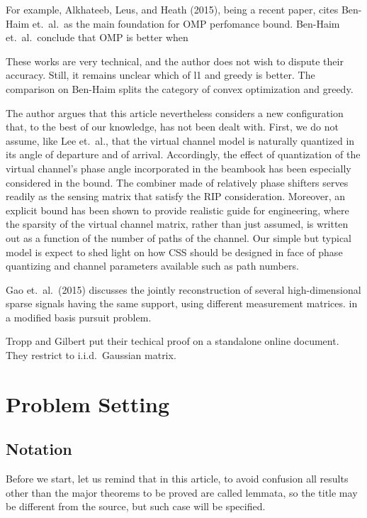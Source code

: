 \documentclass[12pt]{article}
\begin{document}
For example, Alkhateeb, Leus, and Heath (2015), being a recent paper, cites Ben-Haim et.\ al.\ as the main foundation for OMP perfomance bound.
Ben-Haim et.\ al.\ conclude that OMP is better when 

These works are very technical, and the author does not wish to dispute their accuracy.
Still, it remains unclear which of l1 and greedy is better.
The comparison on Ben-Haim splits the category of convex optimization and greedy.


The author argues that this article nevertheless considers a new configuration that, to the best of our knowledge, has not been dealt with.
First, we do not assume, like Lee et.\ al., that the virtual channel model is naturally quantized in its angle of departure and of arrival.
Accordingly, the effect of quantization of the virtual channel's phase angle incorporated in the beambook has been especially considered in the bound.
The combiner made of relatively phase shifters serves readily as the sensing matrix that satisfy the RIP consideration.
Moreover, an explicit bound has been shown to provide realistic guide for engineering, where the sparsity of the virtual channel matrix, rather than just assumed, is written out as a function of the number of paths of the channel.
Our simple but typical model is expect to shed light on how CSS should be designed in face of phase quantizing and channel parameters available such as path numbers.

Gao et.\ al.\ (2015) discusses the jointly reconstruction of several high-dimensional sparse signals having the same support, using different measurement matrices.
in a modified basis pursuit problem.

Tropp and Gilbert put their techical proof on a standalone online document.
They restrict to i.i.d.\ Gaussian matrix.

\section{Problem Setting}

\subsection{Notation}

Before we start, let us remind that in this article, to avoid confusion all results other than the major theorems to be proved are called lemmata, so the title may be different from the source, but such case will be specified.
\end{document}
